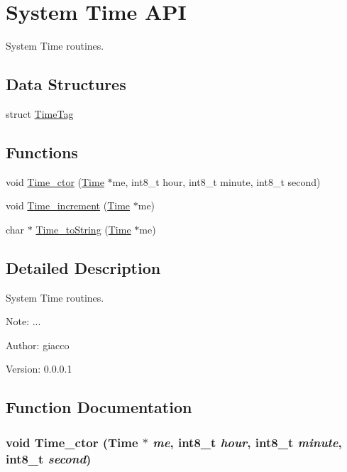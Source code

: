 \hypertarget{group___t_i_m_e_a_p_i}{
\section{System Time API}
\label{group___t_i_m_e_a_p_i}
}
System Time routines.  


\subsection*{Data Structures}
\begin{CompactItemize}
\item 
struct \hyperlink{struct_time_tag}{TimeTag}
\end{CompactItemize}
\subsection*{Functions}
\begin{CompactItemize}
\item 
void \hyperlink{group___t_i_m_e_a_p_i_g67bfcc9f80489905bbe4152f32cd7d59}{Time\_\-ctor} (\hyperlink{struct_time_tag}{Time} $\ast$me, int8\_\-t hour, int8\_\-t minute, int8\_\-t second)
\item 
void \hyperlink{group___t_i_m_e_a_p_i_g365e8c6d726ee14937fc0041c91c50aa}{Time\_\-increment} (\hyperlink{struct_time_tag}{Time} $\ast$me)
\item 
char $\ast$ \hyperlink{group___t_i_m_e_a_p_i_gbb031a679ff73e5c3a6ee651233e9c2c}{Time\_\-toString} (\hyperlink{struct_time_tag}{Time} $\ast$me)
\end{CompactItemize}


\subsection{Detailed Description}
System Time routines. 

\begin{Desc}
\item[Note:]... \end{Desc}
\begin{Desc}
\item[Author:]giacco \end{Desc}
\begin{Desc}
\item[Version:]0.0.0.1 \end{Desc}


\subsection{Function Documentation}
\hypertarget{group___t_i_m_e_a_p_i_g67bfcc9f80489905bbe4152f32cd7d59}{
\subsubsection[{Time\_\-ctor}]{\setlength{\rightskip}{0pt plus 5cm}void Time\_\-ctor ({\bf Time} $\ast$ {\em me}, \/  int8\_\-t {\em hour}, \/  int8\_\-t {\em minute}, \/  int8\_\-t {\em second})}}
\label{group___t_i_m_e_a_p_i_g67bfcc9f80489905bbe4152f32cd7d59}


